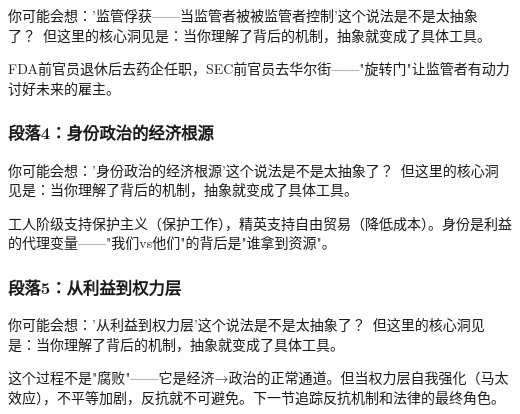 \documentclass[a4paper,12pt]{book}
\newenvironment{motivation}{\begin{tcolorbox}[colback=gray!10,colframe=gray!60,title=\textit{动机}]\small\itshape}{\end{tcolorbox}}
\begin{document}
\begin{motivation}
\begin{motivation}
\begin{motivation}
	\begin{tcolorbox}[colback=yellow!5, title=\textit{读者行为预测}]
		你可能会想：'监管俘获——当监管者被被监管者控制'这个说法是不是太抽象了？\ 但这里的核心洞见是：当你理解了背后的机制，抽象就变成了具体工具。
	\end{tcolorbox}

FDA前官员退休后去药企任职，SEC前官员去华尔街——"旋转门"让监管者有动力讨好未来的雇主。

	\subsubsection*{段落4：身份政治的经济根源}

	\begin{tcolorbox}[colback=yellow!5, title=\textit{读者行为预测}]
		你可能会想：'身份政治的经济根源'这个说法是不是太抽象了？\ 但这里的核心洞见是：当你理解了背后的机制，抽象就变成了具体工具。
	\end{tcolorbox}

工人阶级支持保护主义（保护工作），精英支持自由贸易（降低成本）。身份是利益的代理变量——"我们vs他们"的背后是"谁拿到资源"。

	\subsubsection*{段落5：从利益到权力层}

	\begin{tcolorbox}[colback=yellow!5, title=\textit{读者行为预测}]
		你可能会想：'从利益到权力层'这个说法是不是太抽象了？\ 但这里的核心洞见是：当你理解了背后的机制，抽象就变成了具体工具。
	\end{tcolorbox}

这个过程不是"腐败"——它是经济→政治的正常通道。但当权力层自我强化（马太效应），不平等加剧，反抗就不可避免。下一节追踪反抗机制和法律的最终角色。

	

\end{motivation}
\end{motivation}
\end{motivation}
\end{document}

